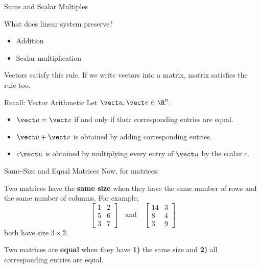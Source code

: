 \begin{frame}{Sums and Scalar Multiples}

What does linear system preserve?\pause
\begin{itemize}
  \item \textcolor{lecturemagenta}{Addition}
  \item \textcolor{lecturemagenta}{Scalar multiplication}
\end{itemize}\pause
\vfill
Vectors satisfy this rule. If we write vectors into a matrix, matrix satisfies the rule too.


\end{frame}

\begin{frame}{Recall: Vector Arithmetic}
Let $\vect u,\vect v\in\R^n$.
\begin{itemize}
  \item $\vect u=\vect v$ if and only if their corresponding entries are equal.
  \item $\vect u+\vect v$ is obtained by adding corresponding entries.
  \item $c\vect u$ is obtained by multiplying every entry of $\vect u$ by the scalar $c$.
\end{itemize}
\end{frame}

\begin{frame}{Same-Size and Equal Matrices}
Now, for matrices:

Two matrices have the \textbf{same size} when they have the same number of rows and the same number of columns. For example,
\[
\begin{bmatrix}1&2\\5&6\\3&7\end{bmatrix}
\quad\text{and}\quad
\begin{bmatrix}14&3\\8&4\\3&9\end{bmatrix}
\]
both have size $3\times2$.
\medskip

Two matrices are \textbf{equal} when they have \textbf{1)} the same size and \textbf{2)} all corresponding entries are equal.
\end{frame}


